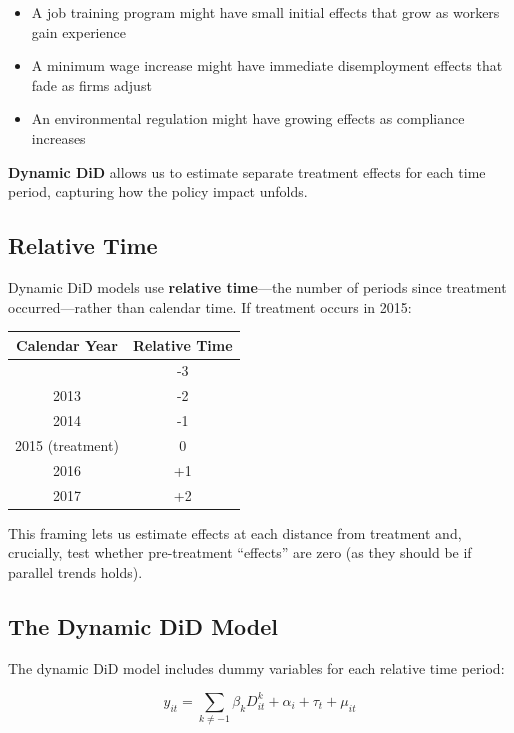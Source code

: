 \documentclass[
  letterpaper,
  DIV=11,
  numbers=noendperiod]{scrreprt}
\newcounter{none} %
\providecommand{\tightlist}{%
  \setlength{\itemsep}{0pt}\setlength{\parskip}{0pt}}
\begin{document}
\begin{itemize}
\tightlist
\item
  A job training program might have small initial effects that grow as
  workers gain experience
\item
  A minimum wage increase might have immediate disemployment effects
  that fade as firms adjust
\item
  An environmental regulation might have growing effects as compliance
  increases
\end{itemize}

\textbf{Dynamic DiD} allows us to estimate separate treatment effects
for each time period, capturing how the policy impact unfolds.

\subsection{Relative Time}\label{relative-time}

Dynamic DiD models use \textbf{relative time}---the number of periods
since treatment occurred---rather than calendar time. If treatment
occurs in 2015:

{\def\LTcaptype{none} %
\begin{longtable}[]{@{}cc@{}}
\toprule\noalign{}
Calendar Year & Relative Time \\
\midrule\noalign{}
\endhead
\bottomrule\noalign{}
\endlastfoot
2012 & -3 \\
2013 & -2 \\
2014 & -1 \\
2015 (treatment) & 0 \\
2016 & +1 \\
2017 & +2 \\
\end{longtable}
}

This framing lets us estimate effects at each distance from treatment
and, crucially, test whether pre-treatment ``effects'' are zero (as they
should be if parallel trends holds).

\subsection{The Dynamic DiD Model}\label{the-dynamic-did-model}

The dynamic DiD model includes dummy variables for each relative time
period:

\[
y_{it} = \sum_{k \neq -1} \beta_k D_{it}^k + \alpha_i + \tau_t + \mu_{it}
\]
\end{document}
